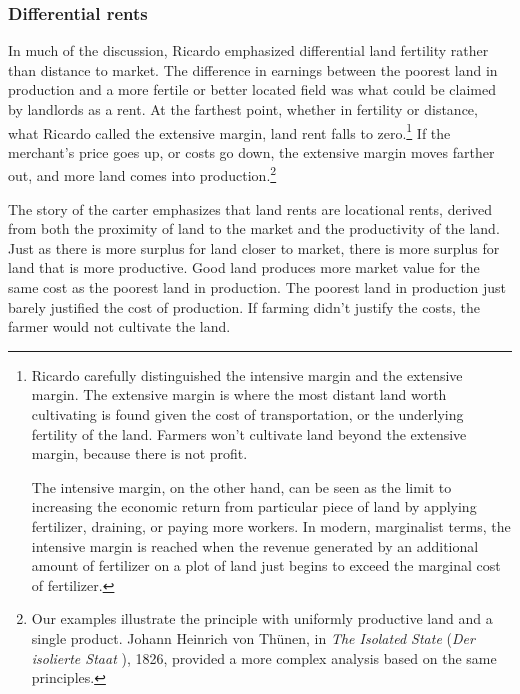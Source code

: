 
\subsubsection{Differential rents}
In much of the discussion, Ricardo emphasized differential land fertility rather than distance to market. 
The difference in earnings between the poorest land in production and a more fertile or better located field was what could be claimed by landlords as a rent. 
At the farthest point, whether in fertility or distance, what Ricardo called the \gls{extensive margin}, land \gls{rent} falls to zero.\footnote{Ricardo carefully distinguished the \gls{intensive margin} and the \gls{extensive margin}. The extensive margin is where the most distant land worth cultivating is found given the cost of transportation, or the underlying fertility of the land. Farmers won't cultivate land beyond the extensive margin, because there is not profit. 

The intensive margin, on the other hand, can be seen as the limit to increasing the economic return from  particular piece of land by applying fertilizer, draining, or paying more workers. In modern, \gls{marginalist} terms, the intensive margin is reached when the revenue generated by an additional amount of fertilizer on a plot of land just begins to exceed the marginal cost of fertilizer.} If the merchant's price goes up, or costs go down, the \gls{extensive margin} moves farther out, and more land comes into production.\footnote{Our examples illustrate the principle with uniformly productive land and a single product. Johann Heinrich von Th\"unen, in \textit{The Isolated State} (\textit{Der isolierte Staat} \cite{vonthunenIsolirteStaatBeziehung1826}), 1826, provided a more complex analysis based on the same principles.}

The story of the carter emphasizes that land rents are locational rents, derived from both the proximity of land to the market and the productivity of the land. Just as there is more surplus for land closer to market, there is more surplus for land that is more productive. Good land produces more market value for the same cost as the poorest land in production. The poorest land in production just barely justified the cost of production. If farming didn't justify the costs, the farmer would not cultivate the land. 

